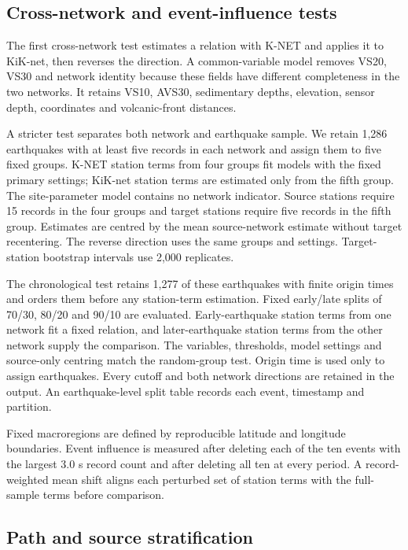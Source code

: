 \documentclass[10pt]{article}
\begin{document}
\subsection*{Cross-network and event-influence tests}

The first cross-network test estimates a relation with K-NET and applies it to KiK-net, then reverses the direction. A common-variable model removes VS20, VS30 and network identity because these fields have different completeness in the two networks. It retains VS10, AVS30, sedimentary depths, elevation, sensor depth, coordinates and volcanic-front distances.

A stricter test separates both network and earthquake sample. We retain 1,286 earthquakes with at least five records in each network and assign them to five fixed groups. K-NET station terms from four groups fit models with the fixed primary settings; KiK-net station terms are estimated only from the fifth group. The site-parameter model contains no network indicator. Source stations require 15 records in the four groups and target stations require five records in the fifth group. Estimates are centred by the mean source-network estimate without target recentering. The reverse direction uses the same groups and settings. Target-station bootstrap intervals use 2,000 replicates.

The chronological test retains 1,277 of these earthquakes with finite origin times and orders them before any station-term estimation. Fixed early/late splits of 70/30, 80/20 and 90/10 are evaluated. Early-earthquake station terms from one network fit a fixed relation, and later-earthquake station terms from the other network supply the comparison. The variables, thresholds, model settings and source-only centring match the random-group test. Origin time is used only to assign earthquakes. Every cutoff and both network directions are retained in the output. An earthquake-level split table records each event, timestamp and partition.

Fixed macroregions are defined by reproducible latitude and longitude boundaries. Event influence is measured after deleting each of the ten events with the largest 3.0 s record count and after deleting all ten at every period. A record-weighted mean shift aligns each perturbed set of station terms with the full-sample terms before comparison.

\subsection*{Path and source stratification}
\end{document}
